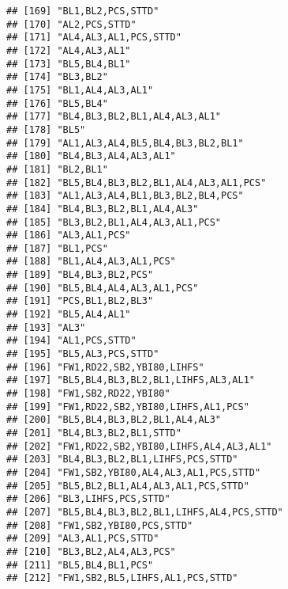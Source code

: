 \documentclass[
]{article}
\begin{document}
\begin{verbatim}
## [169] "BL1,BL2,PCS,STTD"                                
## [170] "AL2,PCS,STTD"                                    
## [171] "AL4,AL3,AL1,PCS,STTD"                            
## [172] "AL4,AL3,AL1"                                     
## [173] "BL5,BL4,BL1"                                     
## [174] "BL3,BL2"                                         
## [175] "BL1,AL4,AL3,AL1"                                 
## [176] "BL5,BL4"                                         
## [177] "BL4,BL3,BL2,BL1,AL4,AL3,AL1"                     
## [178] "BL5"                                             
## [179] "AL1,AL3,AL4,BL5,BL4,BL3,BL2,BL1"                 
## [180] "BL4,BL3,AL4,AL3,AL1"                             
## [181] "BL2,BL1"                                         
## [182] "BL5,BL4,BL3,BL2,BL1,AL4,AL3,AL1,PCS"             
## [183] "AL1,AL3,AL4,BL1,BL3,BL2,BL4,PCS"                 
## [184] "BL4,BL3,BL2,BL1,AL4,AL3"                         
## [185] "BL3,BL2,BL1,AL4,AL3,AL1,PCS"                     
## [186] "AL3,AL1,PCS"                                     
## [187] "BL1,PCS"                                         
## [188] "BL1,AL4,AL3,AL1,PCS"                             
## [189] "BL4,BL3,BL2,PCS"                                 
## [190] "BL5,BL4,AL4,AL3,AL1,PCS"                         
## [191] "PCS,BL1,BL2,BL3"                                 
## [192] "BL5,AL4,AL1"                                     
## [193] "AL3"                                             
## [194] "AL1,PCS,STTD"                                    
## [195] "BL5,AL3,PCS,STTD"                                
## [196] "FW1,RD22,SB2,YBI80,LIHFS"                        
## [197] "BL5,BL4,BL3,BL2,BL1,LIHFS,AL3,AL1"               
## [198] "FW1,SB2,RD22,YBI80"                              
## [199] "FW1,RD22,SB2,YBI80,LIHFS,AL1,PCS"                
## [200] "BL5,BL4,BL3,BL2,BL1,AL4,AL3"                     
## [201] "BL4,BL3,BL2,BL1,STTD"                            
## [202] "FW1,RD22,SB2,YBI80,LIHFS,AL4,AL3,AL1"            
## [203] "BL4,BL3,BL2,BL1,LIHFS,PCS,STTD"                  
## [204] "FW1,SB2,YBI80,AL4,AL3,AL1,PCS,STTD"              
## [205] "BL5,BL2,BL1,AL4,AL3,AL1,PCS,STTD"                
## [206] "BL3,LIHFS,PCS,STTD"                              
## [207] "BL5,BL4,BL3,BL2,BL1,LIHFS,AL4,PCS,STTD"          
## [208] "FW1,SB2,YBI80,PCS,STTD"                          
## [209] "AL3,AL1,PCS,STTD"                                
## [210] "BL3,BL2,AL4,AL3,PCS"                             
## [211] "BL5,BL4,BL1,PCS"                                 
## [212] "FW1,SB2,BL5,LIHFS,AL1,PCS,STTD"                  

\end{verbatim}
\end{document}
